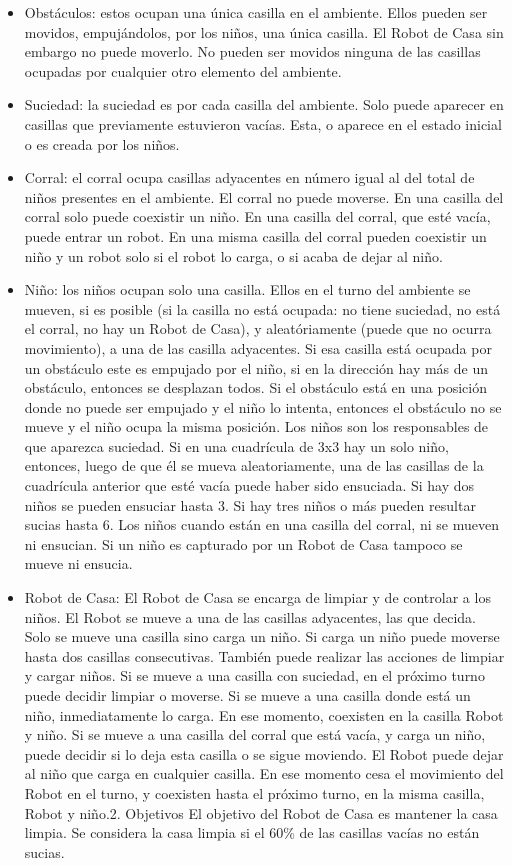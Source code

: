 \documentclass[titlepage,11pt]{scrartcl}
\begin{document}
\begin{itemize}
    \item Obstáculos: estos ocupan una única casilla en el ambiente. Ellos pueden ser movidos, empujándolos, por los niños, una única casilla. El Robot de Casa sin embargo no puede moverlo. No pueden ser movidos ninguna de las casillas ocupadas por cualquier otro elemento del ambiente.
    \item Suciedad: la suciedad es por cada casilla del ambiente. Solo puede aparecer en casillas que previamente estuvieron vacías. Esta, o aparece en el estado inicial o es creada por los niños.
    \item Corral: el corral ocupa casillas adyacentes en número igual al del total de niños presentes en el ambiente. El corral no puede moverse. En una casilla del corral solo puede coexistir un niño. En una casilla del corral, que esté vacía, puede entrar un robot. En una misma casilla del corral pueden coexistir un niño y un robot solo si el robot lo carga, o si acaba de dejar al niño.
    \item Niño: los niños ocupan solo una casilla. Ellos en el turno del ambiente se mueven, si es posible (si la casilla no está ocupada: no tiene suciedad, no está el corral, no hay un Robot de Casa), y aleatóriamente (puede que no ocurra movimiento), a una de las casilla adyacentes. Si esa casilla está ocupada por un obstáculo este es empujado por el niño, si en la dirección hay más de un obstáculo, entonces se desplazan todos. Si el obstáculo está en una posición donde no puede ser empujado y el niño lo intenta, entonces el obstáculo no se mueve y el niño ocupa la misma posición. Los niños son los responsables de que aparezca suciedad. Si en una cuadrícula de 3x3 hay un solo niño, entonces, luego de que él se mueva aleatoriamente, una de las casillas de la cuadrícula anterior que esté vacía puede haber sido ensuciada. Si hay dos niños se pueden ensuciar hasta 3. Si hay tres niños o más pueden resultar sucias hasta 6. Los niños cuando están en una casilla del corral, ni se mueven ni ensucian. Si un niño es capturado por un Robot de Casa tampoco se mueve ni ensucia.
    \item Robot de Casa: El Robot de Casa se encarga de limpiar y de controlar a los niños. El Robot se mueve a una de las casillas adyacentes, las que decida. Solo se mueve una casilla sino carga un niño. Si carga un niño puede moverse hasta dos casillas consecutivas. También puede realizar las acciones de limpiar y cargar niños. Si se mueve a una casilla con suciedad, en el próximo turno puede decidir limpiar o moverse. Si se mueve a una casilla donde está un niño, inmediatamente lo carga. En ese momento, coexisten en la casilla Robot y niño. Si se mueve a una casilla del corral que está vacía, y carga un niño, puede decidir si lo deja esta casilla o se sigue moviendo. El Robot puede dejar al niño que carga en cualquier casilla. En ese momento cesa el movimiento del Robot en el turno, y coexisten hasta el próximo turno, en la misma casilla, Robot y niño.2. Objetivos El objetivo del Robot de Casa es mantener la casa limpia. Se considera la casa limpia si el 60\% de las casillas vacías no están sucias.
\end{itemize}
\end{document}

